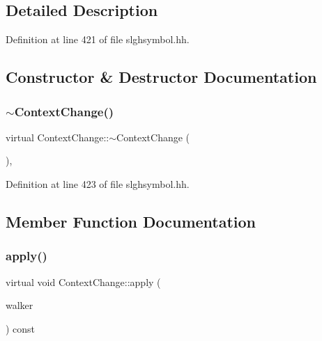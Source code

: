 \subsection{Detailed Description}


Definition at line 421 of file slghsymbol.\+hh.



\subsection{Constructor \& Destructor Documentation}
\mbox{\label{class_context_change_a5d37d43a00630e1a3fe8326eede053bc}} 
\subsubsection{\texorpdfstring{$\sim$ContextChange()}{~ContextChange()}}
{\footnotesize\ttfamily virtual Context\+Change\+::$\sim$\+Context\+Change (\begin{DoxyParamCaption}\item[{void}]{ }\end{DoxyParamCaption})\hspace{0.3cm}{\ttfamily [inline]}, {\ttfamily [virtual]}}



Definition at line 423 of file slghsymbol.\+hh.



\subsection{Member Function Documentation}
\mbox{\label{class_context_change_a969bb7f403bf3a60f1fff0948ba84eeb}} 
\subsubsection{\texorpdfstring{apply()}{apply()}}
{\footnotesize\ttfamily virtual void Context\+Change\+::apply (\begin{DoxyParamCaption}\item[{\mbox{\hyperlink{class_parser_walker_change}{Parser\+Walker\+Change}} \&}]{walker }\end{DoxyParamCaption}) const\hspace{0.3cm}{\ttfamily [pure virtual]}}



